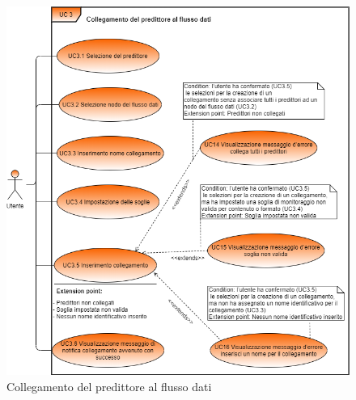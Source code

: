 	\begin{figure}[H]
		\centering
		\includegraphics[scale=0.60]{../Analisi_dei_requisiti/img/Diagrammi_UML/UC3_collegamento_flusso_dati.png}
		\caption{Collegamento del predittore al flusso dati}
	\end{figure}
	
	
	

